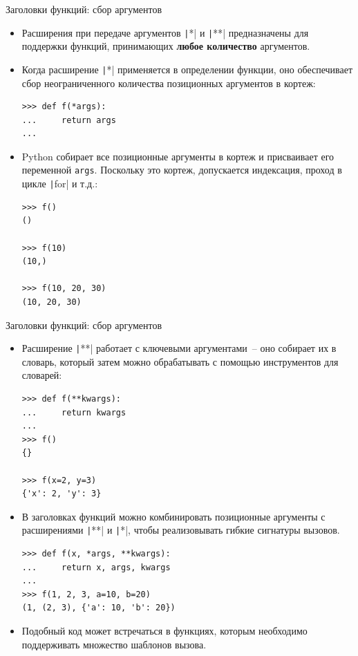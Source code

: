 \documentclass[aspectratio=169]{beamer}%
\begin{document}
\begin{frame}[fragile]{Заголовки функций: сбор аргументов}

\scriptsize
\begin{itemize}
\item Расширения при передаче аргументов \texttt|*| и \texttt|**| предназначены для поддержки функций, принимающих \textcolor{extraorange}{\textbf{любое количество}} аргументов. 
\item Когда расширение \texttt|*| применяется в определении функции, оно обеспечивает сбор неограниченного количества позиционных аргументов в кортеж:

\begin{verbatim}
>>> def f(*args):
...     return args
...
\end{verbatim}

\item Python собирает все позиционные аргументы в кортеж и присваивает его переменной \texttt{args}. Поскольку это кортеж, допускается индексация, проход в цикле \texttt|for| и т.д.:

\begin{verbatim}
>>> f()
()

>>> f(10)
(10,)

>>> f(10, 20, 30)
(10, 20, 30)
\end{verbatim}
\end{itemize}
\vfill
\end{frame}


\begin{frame}[fragile]{Заголовки функций: сбор аргументов}
\scriptsize
\begin{itemize}
\item Расширение \texttt|**| работает с ключевыми аргументами~-- оно собирает их в словарь, который затем можно обрабатывать с помощью инструментов для словарей:

\begin{verbatim}
>>> def f(**kwargs):
...     return kwargs
...
>>> f()
{}

>>> f(x=2, y=3)
{'x': 2, 'y': 3}
\end{verbatim}
\item В заголовках функций можно комбинировать позиционные аргументы с расширениями \texttt|**| и \texttt|*|, чтобы реализовывать гибкие сигнатуры вызовов.

\begin{verbatim}
>>> def f(x, *args, **kwargs):
...     return x, args, kwargs
...
>>> f(1, 2, 3, a=10, b=20)
(1, (2, 3), {'a': 10, 'b': 20})
\end{verbatim}
\item Подобный код может встречаться в функциях, которым необходимо поддерживать множество шаблонов вызова.
\end{itemize}
\vfill
\end{frame}
\end{document}
